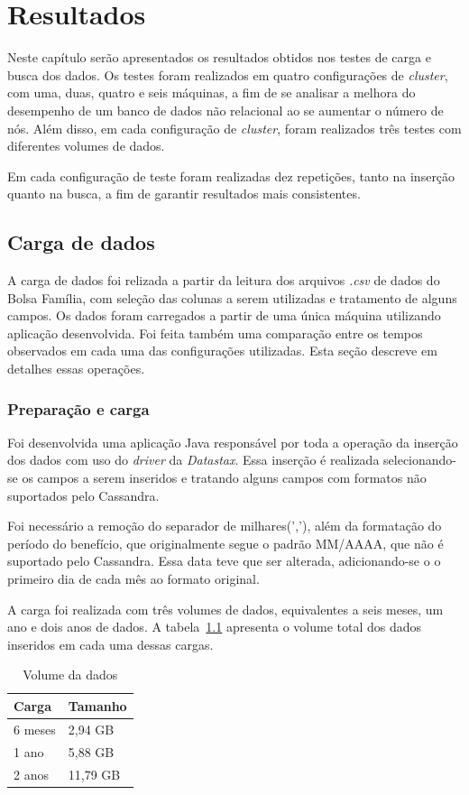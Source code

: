 \chapter{Resultados}

Neste capítulo serão apresentados os resultados obtidos nos testes de carga e busca dos dados. Os testes foram realizados em quatro configurações de \emph{cluster}, com uma, duas, quatro e seis máquinas, a fim de se analisar a melhora do desempenho de um banco de dados não relacional ao se aumentar o número de nós. Além disso, em cada configuração de \emph{cluster}, foram realizados três testes com diferentes volumes de dados. 

Em cada configuração de teste foram realizadas dez repetições, tanto na inserção quanto na busca, a fim de garantir resultados mais consistentes. 

\section{Carga de dados}
A carga de dados foi relizada a partir da leitura dos arquivos \emph{.csv} de dados do Bolsa Família, com seleção das colunas a serem utilizadas e tratamento de alguns campos.
Os dados foram carregados a partir de uma única máquina utilizando aplicação desenvolvida. Foi feita também uma comparação entre os tempos observados em cada uma das configurações utilizadas. Esta seção descreve em detalhes essas operações.

\subsection{Preparação e carga}
Foi desenvolvida uma aplicação Java responsável por toda a operação da inserção dos dados com uso do \emph{driver} da \emph{Datastax}. Essa inserção é realizada selecionando-se os campos a serem inseridos e tratando alguns campos com formatos não suportados pelo Cassandra. 

Foi necessário a remoção do separador de milhares(','), além da formatação do período do benefício, que originalmente segue o padrão MM/AAAA, que não é suportado pelo Cassandra. Essa data teve que ser alterada, adicionando-se o o primeiro dia de cada mês ao formato original.

A carga foi realizada com três volumes de dados, equivalentes a seis meses, um ano e dois anos de dados. A tabela~\ref{tab:volume} apresenta o volume total dos dados inseridos em cada uma dessas cargas.

\begin{table}[]
	\centering
	\caption{Volume da dados}
	\label{tab:volume}
	\begin{tabular}{ll}
		\textbf{Carga} & \textbf{Tamanho} \\ \hline
		6 meses        &  2,94 GB             \\ \hline
		1 ano          &  5,88 GB             \\ \hline
		2 anos         &  11,79 GB             \\ \hline
	\end{tabular}
\end{table}


